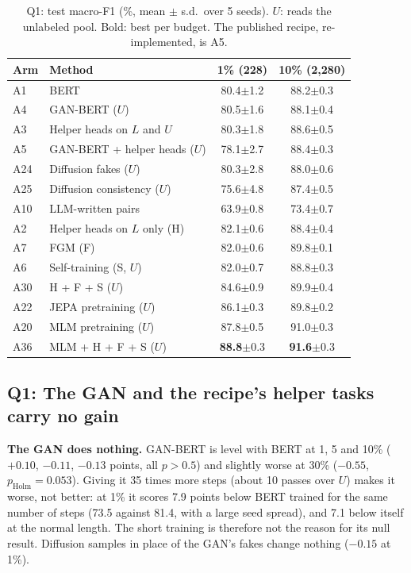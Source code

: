 \documentclass[conference]{IEEEtran}
\newcommand{\A}[1]{\textsf{#1}}                         %
\newcommand{\pmsd}[1]{{\scriptsize$\pm$#1}}
\begin{document}
\begin{table}[t]
\centering
\caption{Q1: test macro-F1 (\%, mean $\pm$ s.d.\ over 5 seeds). $U$: reads the unlabeled pool. Bold: best per budget. The published recipe, re-implemented, is \A{A5}.}
\label{tab:main}
\footnotesize
\setlength{\tabcolsep}{4pt}
\begin{tabular}{llcc}
\toprule
Arm & Method & 1\% (228) & 10\% (2,280) \\
\midrule
\A{A1} & BERT & 80.4\pmsd{1.2} & 88.2\pmsd{0.3} \\
\midrule
\A{A4} & GAN-BERT ($U$) & 80.5\pmsd{1.6} & 88.1\pmsd{0.4} \\
\A{A3} & Helper heads on $L$ and $U$ & 80.3\pmsd{1.8} & 88.6\pmsd{0.5} \\
\A{A5} & GAN-BERT + helper heads ($U$) & 78.1\pmsd{2.7} & 88.4\pmsd{0.3} \\
\A{A24} & Diffusion fakes ($U$) & 80.3\pmsd{2.8} & 88.0\pmsd{0.6} \\
\A{A25} & Diffusion consistency ($U$) & 75.6\pmsd{4.8} & 87.4\pmsd{0.5} \\
\A{A10} & LLM-written pairs & 63.9\pmsd{0.8} & 73.4\pmsd{0.7} \\
\midrule
\A{A2} & Helper heads on $L$ only (H) & 82.1\pmsd{0.6} & 88.4\pmsd{0.4} \\
\A{A7} & FGM (F) & 82.0\pmsd{0.6} & 89.8\pmsd{0.1} \\
\A{A6} & Self-training (S, $U$) & 82.0\pmsd{0.7} & 88.8\pmsd{0.3} \\
\A{A30} & H + F + S ($U$) & 84.6\pmsd{0.9} & 89.9\pmsd{0.4} \\
\midrule
\A{A22} & JEPA pretraining ($U$) & 86.1\pmsd{0.3} & 89.8\pmsd{0.2} \\
\A{A20} & MLM pretraining ($U$) & 87.8\pmsd{0.5} & 91.0\pmsd{0.3} \\
\A{A36} & MLM + H + F + S ($U$) & \textbf{88.8}\pmsd{0.3} & \textbf{91.6}\pmsd{0.3} \\
\bottomrule
\end{tabular}
\end{table}

\subsection{Q1: The GAN and the recipe's helper tasks carry no gain}

\textbf{The GAN does nothing.} GAN-BERT is level with BERT at 1, 5 and 10\% ($+0.10$, $-0.11$, $-0.13$ points, all $p > 0.5$) and slightly worse at 30\% ($-0.55$, $p_{\mathrm{Holm}} = 0.053$). Giving it 35 times more steps (about 10 passes over $U$) makes it worse, not better: at 1\% it scores 7.9 points below BERT trained for the same number of steps (73.5 against 81.4, with a large seed spread), and 7.1 below itself at the normal length. The short training is therefore not the reason for its null result. Diffusion samples in place of the GAN's fakes change nothing ($-0.15$ at 1\%).
\end{document}
